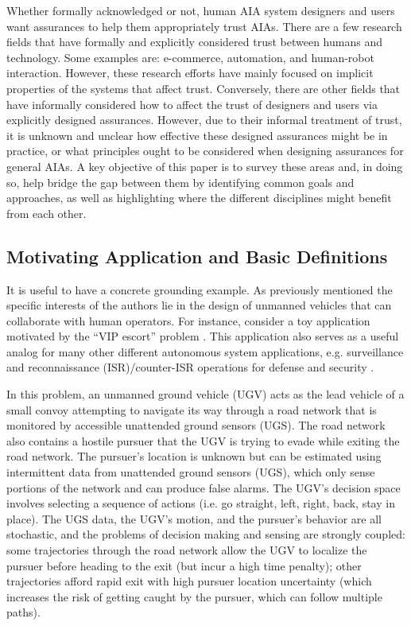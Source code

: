     Whether formally acknowledged or not, human AIA system designers and users want assurances to help them appropriately trust AIAs. There are a few research fields that have formally and explicitly considered trust between humans and technology. Some examples are: e-commerce, automation, and human-robot interaction. However, these research efforts have mainly focused on implicit properties of the systems that affect trust. Conversely, there are other fields that have informally considered how to affect the trust of designers and users via explicitly designed assurances. However, due to their informal treatment of trust, it is unknown and unclear how effective these designed assurances might be in practice, or what principles ought to be considered when designing assurances for general AIAs. A key objective of this paper is to survey these areas and, in doing so, help bridge the gap between them by identifying common goals and approaches, as well as highlighting where the different disciplines might benefit from each other.

\subsection{Motivating Application and Basic Definitions} \label{sec:mot_example}
    It is useful to have a concrete grounding example. As previously mentioned the specific interests of the authors lie in the design of unmanned vehicles that can collaborate with human operators. For instance, consider a toy application motivated by the ``VIP escort'' problem \cite{Humphrey2012-lr}. This application also serves as a useful analog for many other different autonomous system applications, e.g. surveillance and reconnaissance (ISR)/counter-ISR operations for defense and security \cite{Kingston2012-va}.

In this problem, an unmanned ground vehicle (UGV) acts as the lead vehicle of a small convoy attempting to navigate its way through a road network that is monitored by accessible unattended ground sensors (UGS). The road network also contains a hostile pursuer that the UGV is trying to evade while exiting the road network. %
The pursuer's location is unknown but can be estimated using intermittent data from unattended ground sensors (UGS), which only sense portions of the network and can produce false alarms. The UGV's decision space involves selecting a sequence of actions (i.e. go straight, left, right, back, stay in place). The UGS data, the UGV's motion, and the pursuer's behavior are all stochastic, and the problems of decision making and sensing are strongly coupled: some trajectories through the road network allow the UGV to localize the pursuer before heading to the exit (but incur a high time penalty); other trajectories afford rapid exit with high pursuer location uncertainty (which increases the risk of getting caught by the pursuer, which can follow multiple paths). 

